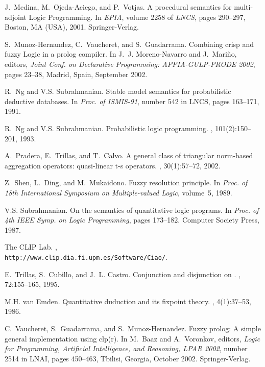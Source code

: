 \documentclass[runningheads,a4paper]{llncs}
\begin{document}
\begin{thebibliography}{10}
J.~Medina, M.~Ojeda-Aciego, and P.~Votjas.
\newblock A procedural semantics for multi-adjoint {L}ogic {P}rogramming.
\newblock In {\em EPIA}, volume 2258 of {\em LNCS}, pages 290--297, Boston, MA
  (USA), 2001. Springer-Verlag.

S.~Munoz-Hernandez, C.~Vaucheret, and S.~Guadarrama.
\newblock Combining crisp and fuzzy {L}ogic in a prolog compiler.
\newblock In J.~J. Moreno-Navarro and J.~Mari{\~n}o, editors, {\em Joint Conf.
  on Declarative {P}rogramming: APPIA-GULP-PRODE 2002}, pages 23--38, Madrid,
  Spain, September 2002.

R.~Ng and V.S. Subrahmanian.
\newblock Stable model semantics for probabilistic deductive databases.
\newblock In {\em Proc. of ISMIS-91}, number 542 in LNCS, pages 163--171, 1991.

R.~Ng and V.S. Subrahmanian.
\newblock Probabilistic logic programming.
, 101(2):150--201, 1993.

A.~Pradera, E.~Trillas, and T.~Calvo.
\newblock A general class of triangular norm-based aggregation operators:
  quasi-linear t-s operators.
, 30(1):57--72,
  2002.

Z.~Shen, L.~Ding, and M.~Mukaidono.
\newblock Fuzzy resolution principle.
\newblock In {\em Proc. of 18th International Symposium on Multiple-valued
  {L}ogic}, volume~5, 1989.

V.S. Subrahmanian.
\newblock On the semantics of quantitative logic programs.
\newblock In {\em Proc. of 4th IEEE Symp. on {L}ogic {P}rogramming}, pages
  173--182. Computer Society Press, 1987.

{The CLIP Lab}.
, \\
  \texttt{http://www.clip.dia.fi.upm.es/Software/Ciao/}.

E.~Trillas, S.~Cubillo, and J.~L. Castro.
\newblock Conjunction and disjunction on .
, 72:155--165, 1995.

M.H. van Emden.
\newblock Quantitative duduction and its fixpoint theory.
, 4(1):37--53, 1986.

C.~Vaucheret, S.~Guadarrama, and S.~Munoz-Hernandez.
\newblock Fuzzy prolog: A simple general implementation using clp(r).
\newblock In M.~Baaz and A.~Voronkov, editors, {\em {L}ogic for {P}rogramming,
  Artificial Intelligence, and Reasoning, LPAR 2002}, number 2514 in LNAI,
  pages 450--463, Tbilisi, Georgia, October 2002. Springer-Verlag.


\end{thebibliography}
\end{document}
